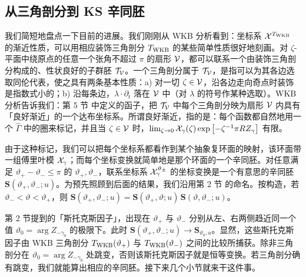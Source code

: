 
\subsection{从三角剖分到 KS 辛同胚}

我们简短地盘点一下目前的进展。我们刚刚从 WKB 分析看到：坐标系 $\mathcal{X}^{T_{\rm WKB}}$ 的渐近性质，可以用相应装饰三角剖分 $T_{\rm WKB}$ 的某些简单性质很好地刻画。对 $\zeta$-平面中绕原点的任意一个张角不超过 $\pi$ 的扇形 $\mathcal{V}$，都可以联系一个由装饰三角剖分构成的、性状良好的子群胚 $\mathcal{T}_{\mathcal{V}}$。一个三角剖分属于 $\mathcal{T}_{\mathcal{V}}$，是指可以为其各边选取同伦代表，使之具有两条基本性质：a) 对一切 $\zeta\in\mathcal{V}$，沿各边走向奇点时装饰是指数式小的；b) 沿每条边，$\lambda\cdot\partial_t$ 落在 $\mathcal{V}$ 中（对 $\lambda$ 的符号作某种选取）。WKB 分析告诉我们：第 5 节%
中定义的函子，把 $\mathcal{T}_{\mathcal{V}}$ 中每个三角剖分映为扇形 $\mathcal{V}$ 内具有「良好渐近」的一个达布坐标系。所谓良好渐近，指的是：每个函数都自然地用一个 $\hat\Gamma$ 中的圈来标记，并且当 $\zeta\in\mathcal{V}$ 时，$\lim_{\zeta\to0}\mathcal{X}_\gamma(\zeta)\exp\left[-\zeta^{-1}\pi R Z_\gamma\right]$ 有限。

由于这种标记，我们可以把每个坐标系都看作到某个抽象复环面的映射，该环面带一组傅里叶模 $\mathcal{X}_\gamma$；而每个坐标变换就简单地是那个环面的一个辛同胚。对任意满足 $\vartheta_+-\vartheta_-\le\pi$ 的 $\vartheta_+,\vartheta_-$，联系坐标系 $\mathcal{X}^{\vartheta_\pm}_\gamma$ 的坐标变换是一个有意思的辛同胚 $\mathbf{S}(\vartheta_+,\vartheta_-;u)$。为预先照顾到后面的结果，我们沿用第 2 节%
的命名。按构造，若 $\vartheta_-<\vartheta<\vartheta_+$，则 $\mathbf{S}(\vartheta_+,\vartheta_-;u)=\mathbf{S}(\vartheta_+,\vartheta;u)\,\mathbf{S}(\vartheta,\vartheta_-;u)$。

第 2 节提到的「斯托克斯因子」，出现在 $\vartheta_+$ 与 $\vartheta_-$ 分别从左、右两侧趋近同一个值 $\vartheta_0=\arg Z_{-\gamma_0}$ 的极限下。此时 $\mathbf{S}(\vartheta_+,\vartheta_-;u)\to\mathbf{S}_{\vartheta_0,u}$。显然，这些斯托克斯因子由 WKB 三角剖分 $T_{\rm WKB}(\vartheta_+)$ 与 $T_{\rm WKB}(\vartheta_-)$ 之间的比较所捕获。除非三角剖分在 $\vartheta_0=\arg Z_{-\gamma_0}$ 处跳变，否则该斯托克斯因子就是恒等变换。若三角剖分确有跳变，我们就能算出相应的辛同胚。接下来几个小节就来干这件事。

